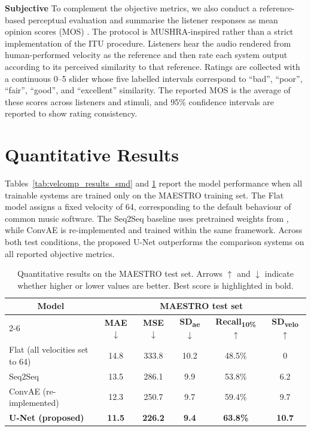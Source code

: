 \textbf{Subjective} To complement the objective metrics, we also conduct a reference-based perceptual evaluation and summarise the listener responses as mean opinion scores (MOS) \cite{series2014mursha}.
The protocol is MUSHRA-inspired rather than a strict implementation of the ITU procedure.
Listeners hear the audio rendered from human-performed velocity as the reference and then rate each system output according to its perceived similarity to that reference.
Ratings are collected with a continuous 0--5 slider whose five labelled intervals correspond to ``bad'', ``poor'', ``fair'', ``good'', and ``excellent'' similarity.
The reported MOS is the average of these scores across listeners and stimuli, and 95\% confidence intervals are reported to show rating consistency.

\section{Quantitative Results}
\label{sec:velcomp:results}

Tables~\ref{tab:velcomp_results_smd} and \ref{tab:velcomp_results_maestro} report the model performance when all trainable systems are trained only on the MAESTRO training set.
The Flat model assigns a fixed velocity of 64, corresponding to the default behaviour of common music software.
The Seq2Seq baseline uses pretrained weights from \cite{kim2023piano}, while ConvAE \cite{kuo2021velocity} is re-implemented and trained within the same framework.
Across both test conditions, the proposed U-Net outperforms the comparison systems on all reported objective metrics.

\begin{table}[h]
\centering
\setlength{\tabcolsep}{5pt}          %
\fontsize{11pt}{13pt}\selectfont     %
\renewcommand{\arraystretch}{1.2}    %
\caption{Quantitative results on the MAESTRO test set. Arrows \(\uparrow\) and \(\downarrow\) indicate whether higher or lower values are better. Best score is highlighted in bold.}
\label{tab:velcomp_results_maestro}
\begin{tabular}{l|ccccc}
\toprule
\multicolumn{1}{c|}{\multirow{2}{*}{\textbf{Model}}}
& \multicolumn{5}{c}{\textbf{MAESTRO test set}} \\
\cmidrule(l){2-6}
& \textbf{MAE} \(\downarrow\)
& \textbf{MSE} \(\downarrow\)
& \textbf{SD\textsubscript{ae}} \(\downarrow\)
& \textbf{Recall\textsubscript{10\%}} \(\uparrow\)
& \textbf{SD\textsubscript{velo}} \(\uparrow\) \\
\midrule
Flat (all velocities set to 64) & 14.8 & 333.8 & 10.2 & 48.5\% & 0 \\
Seq2Seq \cite{kim2023piano} & 13.5 & 286.1 & 9.9 & 53.8\% & 6.2 \\
ConvAE \cite{kuo2021velocity} (re-implemented) & 12.3 & 250.7 & 9.7 & 59.4\% & 9.7 \\
\textbf{U-Net (proposed)} & \textbf{11.5} & \textbf{226.2} & \textbf{9.4} & \textbf{63.8\%} & \textbf{10.7} \\
\bottomrule
\end{tabular}
\end{table}

